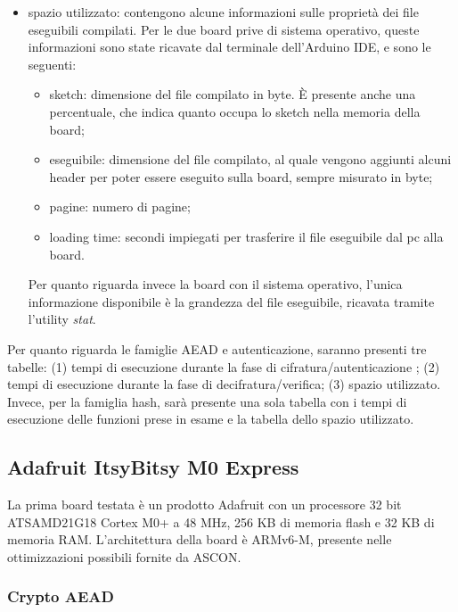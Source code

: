 \documentclass[12pt,a4paper,italian]{report}
\begin{document}
\begin{itemize}
\begin{itemize}
\begin{enumerate}
            \end{enumerate}
    \end{itemize}
    \item spazio utilizzato: contengono alcune informazioni sulle proprietà dei file eseguibili compilati. Per le due board prive di sistema operativo, queste informazioni sono state ricavate dal terminale dell'Arduino IDE, e sono le seguenti:
    \begin{itemize}
        \item sketch: dimensione del file compilato in byte. È presente anche una percentuale, che indica quanto occupa lo sketch nella memoria della board;
        \item eseguibile: dimensione del file compilato, al quale vengono aggiunti alcuni header per poter essere eseguito sulla board, sempre misurato in byte;
        \item pagine: numero di pagine;
        \item loading time: secondi impiegati per trasferire il file eseguibile dal pc alla board.
    \end{itemize}
    Per quanto riguarda invece la board con il sistema operativo, l'unica informazione disponibile è la grandezza del file eseguibile, ricavata tramite l'utility \textit{stat}.
\end{itemize}

\noindent Per quanto riguarda le famiglie AEAD e autenticazione, saranno presenti tre tabelle: (1) tempi di esecuzione durante la fase di cifratura/autenticazione ; (2) tempi di esecuzione durante la fase di decifratura/verifica; (3) spazio utilizzato. Invece, per la famiglia hash, sarà presente una sola tabella con i tempi di esecuzione delle funzioni prese in esame e la tabella dello spazio utilizzato.

\subsection{Adafruit ItsyBitsy M0 Express}

La prima board testata è un prodotto Adafruit con un processore 32 bit ATSAMD21G18 Cortex M0+ a 48 MHz, 256 KB di memoria flash e 32 KB di memoria RAM\cite{adafruit}. L'architettura della board è ARMv6-M, presente nelle ottimizzazioni possibili fornite da ASCON\cite{arm}.

\subsubsection{Crypto AEAD}
\end{document}
